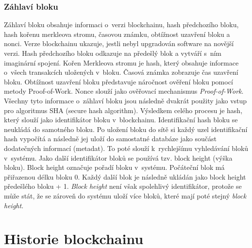\documentclass[12pt]{report}			%
\begin{document}
\subsection{Záhlaví bloku}{
Záhlaví bloku obsahuje informaci o~verzi blockchainu, hash předchozího bloku, hash kořenu merkleova stromu, časovou známku, obtížnost uzavření bloku a nonci. Verze blockchainu ukazuje, jestli nebyl upgradován software na novější verzi. Hash předchozího bloku odkazuje na předešlý blok a vytváří s~ním imaginární spojení. Kořen Merkleova stromu je hash, který obsahuje informace o~všech transakcích uložených v~bloku. Časová známka zobrazuje čas uzavření bloku. Obtížnost uzavření bloku představuje náročnost ověření bloku pomocí metody Proof-of-Work.  Nonce slouží jako ověřovací mechanismus \textit{Proof-of-Work}. Všechny tyto informace o~záhlaví bloku jsou následně dvakrát použity jako vstup pro algoritmus SHA (secure hash algorithm). Výsledkem celého procesu je hash, který slouží jako identifikátor bloku v~blockchainu. Identifikační hash bloku se neukládá do samotného bloku. Po uložení bloku do sítě si každý uzel identifikační hash vypočítá a následně jej uloží do samostatné databáze jako součást dodatečných informací (metadat). To poté slouží k~rychlejšímu vyhledávání bloků v~systému. Jako další identifikátor bloků se používá tzv. block height (výška bloku). Block height označuje pořadí bloku v~systému. Počáteční blok má přiřazenou délku bloku 0. Každý další blok je následně ukládán jako block height předešlého bloku + 1. \textit{Block height} není však spolehlivý identifikátor, protože se může stát, že se zároveň do systému uloží více bloků, které mají poté stejný \textit{block height}. \cite{Antonopoulos2017}
		}
		\chapter{Historie blockchainu}
\end{document}
